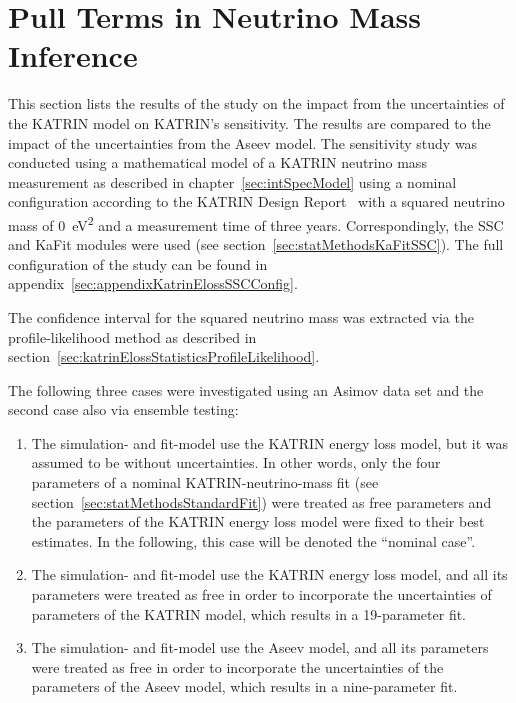 \def\currentRootFolder{chapter/sensitivityStudyWithPreliminaryKatrinElossModel}
\def\currentFigureFolder{\currentRootFolder/fig}
\FloatBarrier
\section{Pull Terms in Neutrino Mass Inference}
\label{sec:katrinElossModelResults}
This section lists the results of the study on the impact from the uncertainties of the KATRIN model on KATRIN's sensitivity. The results are compared to the impact of the uncertainties from the Aseev model. The sensitivity study was conducted using a mathematical model of a KATRIN neutrino mass measurement as described in chapter~\ref{sec:intSpecModel} using a nominal configuration according to the KATRIN Design Report~\cite{Angrik:2005ep} with a squared neutrino mass of \SI{0}{eV^2} and a measurement time of three years. Correspondingly, the SSC and KaFit modules were used (see section~\ref{sec:statMethodsKaFitSSC}). The full configuration of the study can be found in appendix~\ref{sec:appendixKatrinElossSSCConfig}. 

The confidence interval for the squared neutrino mass was extracted via the profile-likelihood method as described in section~\ref{sec:katrinElossStatisticsProfileLikelihood}.

The following three cases were investigated using an Asimov data set and the second case also via ensemble testing:\mynobreakpar
\begin{enumerate}
	\item The simulation- and fit-model use the KATRIN energy loss model, but it was assumed to be without uncertainties. In other words, only the four parameters of a nominal KATRIN-neutrino-mass fit (see section~\ref{sec:statMethodsStandardFit}) were treated as free parameters and the parameters of the KATRIN energy loss model were fixed to their best estimates. In the following, this case will be denoted the ``nominal case''.
	\item The simulation- and fit-model use the KATRIN energy loss model, and all its parameters were treated as free in order to incorporate the uncertainties of parameters of the KATRIN model, which results in a 19-parameter fit.
	\item The simulation- and fit-model use the Aseev model, and all its parameters were treated as free in order to incorporate the uncertainties of the parameters of the Aseev model, which results in a nine-parameter fit.
\end{enumerate}

